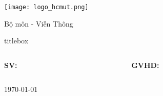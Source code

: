 
\begin{frame}[fragile]
    \centering


    \texttt{[image: logo\_hcmut.png]}

    \vspace{0.2em}

    {\footnotesize\KHOA}

    \vspace{0.2em}

    {\footnotesize Bộ môn - Viễn Thông}

    \vspace{0.5em}

    \begin{beamercolorbox}[rounded=true,shadow=true,sep=1em,center]{titlebox}
        \parbox{0.9\textwidth}{\centering\Large\bfseries \TENLUANVAN}
    \end{beamercolorbox}

    \vspace{0.3em}

    \parbox{0.85\textwidth}{\centering\large\emph{\THESISNAME}}

    \vfill %

    \begin{columns}[T, totalwidth=\textwidth]
        \begin{column}{0.48\textwidth}
            \raggedright
            {\scriptsize
            \textbf{SV:} \\
            \TENTACGIA
            }
        \end{column}
        \begin{column}{0.48\textwidth}
            \raggedleft
            {\scriptsize
            \textbf{GVHD:} \\
            \TENNGUOIHUONGDAN
            }
        \end{column}
    \end{columns}

    \vspace{0.5cm}

    {\scriptsize \centering \today}

\end{frame}

